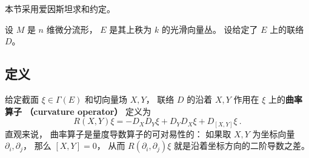 

本节采用爱因斯坦求和约定。

设 $M$ 是 $n$ 维微分流形， $E$ 是其上秩为 $k$ 的光滑向量丛。 设给定了 $E$ 上的联络 $D$。

\subsection{定义}

给定截面 $\xi\in\Gamma(E)$ 和切向量场 $X,Y$， 联络 $D$ 的沿着 $X,Y$ 作用在 $\xi$ 上的\textbf{曲率算子 （curvature operator）} 定义为
$$
R(X,Y)\xi=-D_XD_Y\xi+D_YD_X\xi+D_{[X,Y]}\xi~.
$$
直观来说， 曲率算子是量度导数算子的可对易性的： 如果取 $X,Y$ 为坐标向量 $\partial_i,\partial_j$， 那么 $[X,Y]=0$， 从而 $R(\partial_i,\partial_j)\xi$ 就是沿着坐标方向的二阶导数之差。

